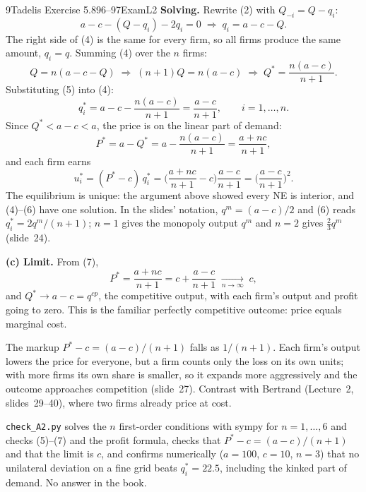 \begin{exsol}{9}{Tadelis Exercise 5.8}{96--97}{Exam}{L2}
\textbf{Solving.} Rewrite (2) with $Q_{-i} = Q - q_i$:
\[
  a - c - (Q - q_i) - 2q_i = 0 \;\Longrightarrow\; q_i = a - c - Q . \tag{4}
\]
The right side of (4) is the same for every firm, so all firms produce the same amount, $q_i = q$.
Summing (4) over the $n$ firms:
\[
  Q = n(a - c - Q) \;\Longrightarrow\; (n+1)Q = n(a - c) \;\Longrightarrow\;
  Q^* = \frac{n(a-c)}{n+1}. \tag{5}
\]
Substituting (5) into (4):
\[
  q_i^* = a - c - \frac{n(a-c)}{n+1} = \frac{a-c}{n+1}, \qquad i = 1, \dots, n. \tag{6}
\]
Since $Q^* < a - c < a$, the price is on the linear part of demand:
\[
  P^* = a - Q^* = a - \frac{n(a-c)}{n+1} = \frac{a + nc}{n+1}, \tag{7}
\]
and each firm earns
\[
  u_i^* = (P^* - c)\,q_i^* = \Big(\frac{a + nc}{n+1} - c\Big)\frac{a-c}{n+1}
        = \Big(\frac{a-c}{n+1}\Big)^2 .
\]
The equilibrium is unique: the argument above showed every NE is interior, and (4)--(6) have one
solution. In the slides' notation, $q^m = (a-c)/2$ and (6) reads $q_i^* = 2q^m/(n+1)$; $n = 1$
gives the monopoly output $q^m$ and $n = 2$ gives $\tfrac23 q^m$ (slide~24).

\textbf{(c) Limit.} From (7),
\[
  P^* = \frac{a + nc}{n+1} = c + \frac{a - c}{n+1} \;\xrightarrow[n\to\infty]{}\; c ,
\]
and $Q^* \to a - c = q^{cp}$, the competitive output, with each firm's output and profit going to
zero. This is the familiar perfectly competitive outcome: price equals marginal cost.

\interp The markup $P^* - c = (a-c)/(n+1)$ falls as $1/(n+1)$. Each firm's output lowers the
price for everyone, but a firm counts only the loss on its own units; with more firms its own share
is smaller, so it expands more aggressively and the outcome approaches competition (slide~27).
Contrast with Bertrand (Lecture~2, slides~29--40), where two firms already price at cost.

\verify \texttt{check\_A2.py} solves the $n$ first-order conditions with sympy for
$n = 1, \dots, 6$ and checks (5)--(7) and the profit formula, checks that $P^* - c = (a-c)/(n+1)$
and that the limit is $c$, and confirms numerically ($a = 100$, $c = 10$, $n = 3$) that no
unilateral deviation on a fine grid beats $q_i^* = 22.5$, including the kinked part of demand.
No answer in the book.

\answer{(a) $N = \{1,\dots,n\}$, $S_i = [0,\infty)$,
$u_i = (a - \sum_j q_j)\,q_i - c\,q_i$ (with price $0$ if $\sum_j q_j > a$); the printed
``$Q = q_i + \cdots + q_n$'' should be $q_1 + \cdots + q_n$. (b) Unique NE
$q_i^* = \frac{a-c}{n+1}$, $Q^* = \frac{n(a-c)}{n+1}$, $P^* = \frac{a + nc}{n+1}$, profit
$\big(\frac{a-c}{n+1}\big)^2$. (c) $P^* \to c$: the perfectly competitive price (price $=$
marginal cost).}
\end{exsol}
